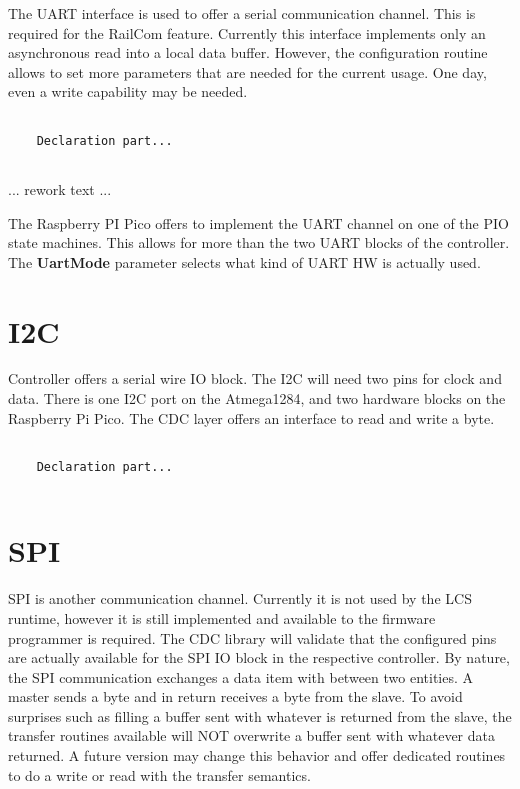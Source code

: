 The UART interface is used to offer a serial communication channel. This is required for the RailCom feature. Currently this interface implements only an asynchronous read into a local data buffer. However, the configuration routine allows to set more parameters that are needed for the current usage. One day, even a write capability may be needed.

\lstset{language=c++, style=codesnippetstyle}
\begin{lstlisting}
   
    Declaration part...
    
\end{lstlisting}
\FloatBarrier

... rework text ... 

The Raspberry PI Pico offers to implement the UART channel on one of the PIO state machines. This allows for more than the two UART blocks of the controller. The \textbf{UartMode} parameter selects what kind of UART HW is actually used.

\section{I2C}

Controller offers a serial wire IO block. The I2C will need two pins for clock and data. There is one I2C port on the Atmega1284, and two hardware blocks on the Raspberry Pi Pico. The CDC layer offers an interface to read and write a byte.

\lstset{language=c++, style=codesnippetstyle}
\begin{lstlisting}
   
    Declaration part...
    
\end{lstlisting}
\FloatBarrier

\section{SPI}

SPI is another communication channel. Currently it is not used by the LCS runtime, however it is still implemented and available to the firmware programmer is required. The CDC library will validate that the configured pins are actually available for the SPI IO block in the respective controller. By nature, the SPI communication exchanges a data item with between two entities. A master sends a byte and in return receives a byte from the slave. To avoid surprises such as filling a buffer sent with whatever is returned from the slave, the transfer routines available will NOT overwrite a buffer sent with whatever data returned. A future version may change this behavior and offer dedicated routines to do a write or read with the transfer semantics.

